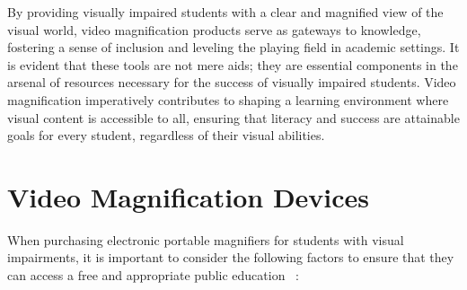 By providing visually impaired students with a clear and magnified view of the visual world, video magnification products serve as gateways to knowledge, fostering a sense of inclusion and leveling the playing field in academic settings. It is evident that these tools are not mere aids; they are essential components in the arsenal of resources necessary for the success of visually impaired students. Video magnification imperatively contributes to shaping a learning environment where visual content is accessible to all, ensuring that literacy and success are attainable goals for every student, regardless of their visual abilities.

\section{Video Magnification Devices}\label{sec:video-magnification-devices}

When purchasing electronic portable magnifiers for students with visual impairments, it is important to consider the following factors to ensure that they can access a free and appropriate public education~ \cite{PerkinsVideoMagnifier}:

